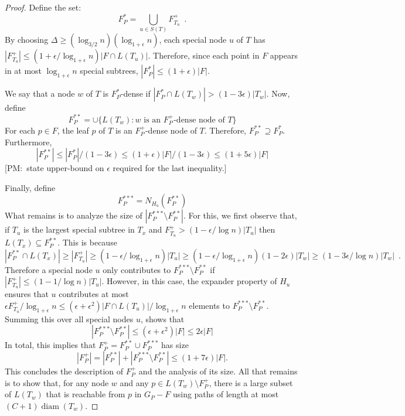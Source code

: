 \documentclass{patmorin}
\newcommand{\note}[2]{{\color{red}[#1:~#2]}}
\DeclareMathOperator{\diam}{diam}
\begin{document}
\begin{proof}
  Define the set:
  \[  
    F^*_P = \bigcup_{u\in S(T)} F^+_{T_u} \enspace .
  \]
  By choosing $\Delta \ge (\log_{3/2} n)(\log_{1+\epsilon}
  n)$, each special node $u$ of $T$ has $|F^+_{T_u}|\le
  (1+\epsilon/\log_{1+\epsilon} n)|F\cap L(T_u)|$. Therefore, since
  each point in $F$ appears in at most $\log_{1+\epsilon} n$ special
  subtrees, $|F^*_P|\le (1+\epsilon)|F|$.

  We say that a node $w$ of $T$ is $F^*_P$-dense if $|F^*_P \cap L(T_w)| >
  (1-3\epsilon)|T_w|$.  Now, define
  \[  
     F^{**}_P = \cup\{ L(T_w) : \text{$w$ is an $F^+_P$-dense node of $T$} \}
  \]
  For each $p\in F$, the leaf $p$ of $T$ is an $F^+_P$-dense node of
  $T$. Therefore, $F^{**}_P\supseteq F^{*}_P$.  Furthermore,
  \[
      |F^{**}_P| \le |F^*_P|/(1-3\epsilon) \le (1+\epsilon)|F|/(1-3\epsilon) \le (1+5\epsilon)|F|
  \]
  \note{PM}{state upper-bound on $\epsilon$ required for the last inequality.}

  Finally, define 
  \[  F^{***}_P = N_{H_u}(F^{**}_P)  \]
  What remains is to analyze the size of $|F^{***}_P\setminus F^{**}_P|$.
  For this, we first observe that, if $T_u$ is the largest special
  subtree in $T_x$ and $F^+_{T_u} > (1-\epsilon/\log n)|T_u|$ then
  $L(T_x)\subseteq F^{**}_P$.  This is because
  \[
     |F^{**}_P\cap L(T_x)| 
  \ge  
     |F^+_{T_u}|
  \ge  
     (1-\epsilon/\log_{1+\epsilon} n)|T_u|
  \ge  
     (1-\epsilon/\log_{1+\epsilon} n)(1-2\epsilon)|T_w|
  \ge  
     (1-3\epsilon/\log n)|T_w| \enspace .
  \]
  Therefore a special node $u$ only contributes to $F^{***}_P\setminus
  F^{**}_P$ if $|F^+_{T_u}| \le (1-1/\log n)|T_u|$.  However,
  in this case, the expander property of $H_u$ ensures that $u$
  contributes at most $\epsilon F^+_{T_u}/\log_{1+\epsilon} n\le
  (\epsilon+\epsilon^2)|F\cap L(T_u)|/\log_{1+\epsilon} n$ elements to
  $F^{***}_P\setminus F^{**}_P$.  Summing this over all special nodes $u$,
  shows that
  \[
     |F^{***}_P\setminus F^{**}_P| \le (\epsilon+\epsilon^2)|F| \le 2\epsilon|F|
  \]
  In total, this implies that $F^+_P = F^{**}_P\cup F^{***}_P$ has size
  \[ |F^+_P| = |F^{**}_P| + |F^{***}_P\setminus F^{**}_P|\le (1+7\epsilon)|F| .
  \]  
  This concludes the description of $F^+_P$ and the analysis of its
  size.  All that remains is to show that, for any node $w$ and any
  $p\in L(T_w)\setminus F^+_P$, there is a large subset of $L(T_w)$
  that is reachable from $p$ in $G_P-F$ using paths of length at most
  $(C+1)\diam(T_w)$.


\end{proof}
\end{document}
